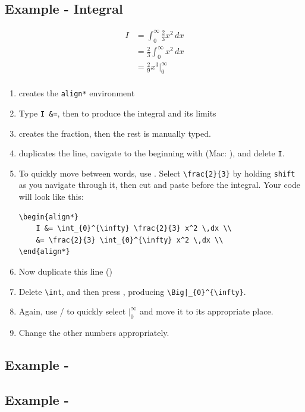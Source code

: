\subsection{Example - Integral}
\begin{align*}
    I &= \int_{0}^{\infty} \frac{2}{3} x^2 \,dx \\
    &= \frac{2}{3} \int_{0}^{\infty} x^2 \,dx \\
    &= \frac{2}{9} x^3 \Big|_{0}^{\infty} \\
\end{align*}
\begin{enumerate}
    \item {} creates the \texttt{align*} environment
    \item Type \verb|I &=|, then  to produce the integral and its limits
    \item {} creates the fraction, then the rest is manually typed.
    \item \keys{\Alt + \shift + \arrowkeydown} duplicates the line, navigate to the beginning with \keys{\ctrl + \arrowkeyleft} (Mac: \keys{\cmd + \arrowkeyleft}), and delete \verb|I|. 
    \item To quickly move between words, use \keys{\Alt + \arrowkeyright} \keys{\arrowkeyleft}. Select \verb|\frac{2}{3}| by holding \texttt{shift} as you navigate through it, then cut and paste before the integral. Your code will look like this:
    \begin{lstlisting}
\begin{align*}
    I &= \int_{0}^{\infty} \frac{2}{3} x^2 \,dx \\
    &= \frac{2}{3} \int_{0}^{\infty} x^2 \,dx \\
\end{align*}        
    \end{lstlisting}
    \item Now duplicate this line (\keys{\Alt + \shift + \arrowkeydown})
    \item Delete \verb|\int|, and then press , producing \verb!\Big|_{0}^{\infty}!.
    \item Again, use \keys{\Alt + \shift + \arrowkeyleft}/\keys{\arrowkeyright} to quickly select \( \Big|_{0}^{\infty} \) and move it to its appropriate place.
    \item Change the other numbers appropriately.
\end{enumerate}
\subsection{Example - }
\subsection{Example - }
